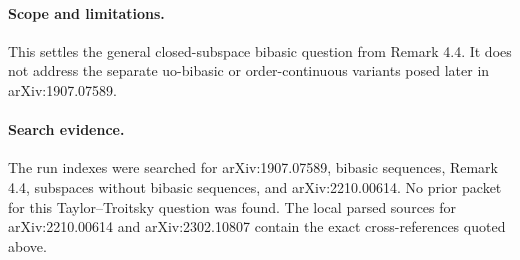 \documentclass[11pt]{article}
\begin{document}
\paragraph{Scope and limitations.}
This settles the general closed-subspace bibasic question from Remark 4.4.  It does not address the separate uo-bibasic or order-continuous variants posed later in arXiv:1907.07589.

\paragraph{Search evidence.}
The run indexes were searched for arXiv:1907.07589, bibasic sequences, Remark 4.4, subspaces without bibasic sequences, and arXiv:2210.00614.  No prior packet for this Taylor--Troitsky question was found.  The local parsed sources for arXiv:2210.00614 and arXiv:2302.10807 contain the exact cross-references quoted above.
\end{document}
